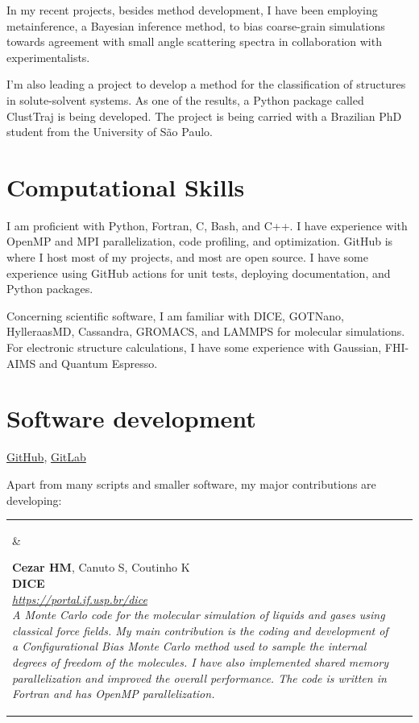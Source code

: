 \documentclass[10pt]{article}
\newcommand{\newsoftware}[3]{
\begin{adjustwidth}{-1in}{-1in}  
\begin{tabular}{p{0.9in}p{7in}}
\parbox[c]{0.9in}{} & \parbox[c]{6in}{\setstretch{0.9} {\scriptsize {#1}} \\ {\bf #2}  \\ {\footnotesize\emph {#3}}}
\end{tabular}
\end{adjustwidth}
\vspace{0.2in}
}
\begin{document}
In my recent projects, besides method development, I have been employing metainference, a Bayesian inference method, to bias coarse-grain simulations towards agreement with small angle scattering spectra in collaboration with experimentalists.

I'm also leading a project to develop a method for the classification of structures in solute-solvent systems.
As one of the results, a Python package called ClustTraj is being developed.
The project is being carried with a Brazilian PhD student from the University of S\~ao Paulo.

\section*{Computational Skills}
I am proficient with Python, Fortran, C, Bash, and C++. 
I have experience with OpenMP and MPI parallelization, code profiling, and optimization. 
GitHub is where I host most of my projects, and most are open source.
I have some experience using GitHub actions for unit tests, deploying documentation, and Python packages.

Concerning scientific software, I am familiar with DICE, GOTNano, HylleraasMD, Cassandra, GROMACS, and LAMMPS for molecular simulations. 
For electronic structure calculations, I have some experience with Gaussian, FHI-AIMS and Quantum Espresso.


\eject



\section*{Software development}
\href{https://github.com/hmcezar}{GitHub}, 
\href{https://gitlab.com/hmcezar}{GitLab}

Apart from many scripts and smaller software, my major contributions are developing:\\

\newsoftware{\textbf{Cezar HM}, Canuto S, Coutinho K}{DICE}{\href{https://portal.if.usp.br/dice}{https://portal.if.usp.br/dice} \\ 
A Monte Carlo code for the molecular simulation of liquids and gases using classical force fields. My main contribution is the coding and development of a Configurational Bias Monte Carlo method used to sample the internal degrees of freedom of the molecules. I have also implemented shared memory parallelization and improved the overall performance. The code is written in Fortran and has OpenMP parallelization.}
\end{document}
